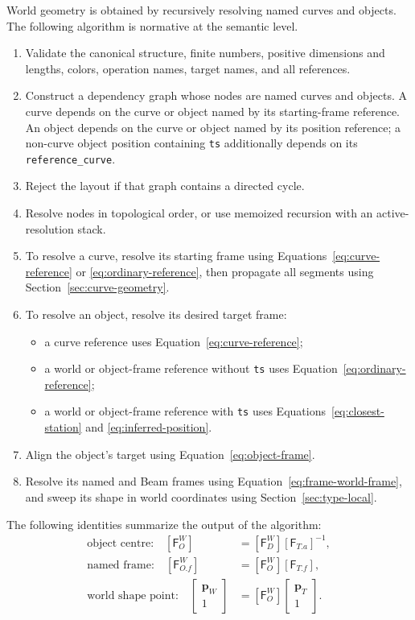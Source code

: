 \documentclass[11pt,a4paper]{article}
\newcommand{\Frame}{\mathsf{F}}
\begin{document}
World geometry is obtained by recursively resolving named curves and objects.
The following algorithm is normative at the semantic level.

\begin{enumerate}
  \item Validate the canonical structure, finite numbers, positive dimensions
        and lengths, colors, operation names, target names, and all references.
  \item Construct a dependency graph whose nodes are named curves and objects.
        A curve depends on the curve or object named by its starting-frame
        reference.  An object depends on the curve or object named by its
        position reference; a non-curve object position containing \texttt{ts}
        additionally depends on its \texttt{reference\_curve}.
  \item Reject the layout if that graph contains a directed cycle.
  \item Resolve nodes in topological order, or use memoized recursion with an
        active-resolution stack.
  \item To resolve a curve, resolve its starting frame using
        Equations~\eqref{eq:curve-reference} or
        \eqref{eq:ordinary-reference}, then propagate all segments using
        Section~\ref{sec:curve-geometry}.
  \item To resolve an object, resolve its desired target frame:
        \begin{itemize}
          \item a curve reference uses Equation~\eqref{eq:curve-reference};
          \item a world or object-frame reference without \texttt{ts} uses
                Equation~\eqref{eq:ordinary-reference};
          \item a world or object-frame reference with \texttt{ts} uses
                Equations~\eqref{eq:closest-station} and
                \eqref{eq:inferred-position}.
        \end{itemize}
  \item Align the object's target using Equation~\eqref{eq:object-frame}.
  \item Resolve its named and Beam frames using
        Equation~\eqref{eq:frame-world-frame}, and sweep its shape in world
        coordinates using Section~\ref{sec:type-local}.
\end{enumerate}

The following identities summarize the output of the algorithm:
\begin{align}
  \text{object centre:}\quad
  [\Frame_O^W]&=[\Frame_D^W][\Frame_{T.a}]^{-1},\\
  \text{named frame:}\quad
  [\Frame_{O.f}^W]&=[\Frame_O^W][\Frame_{T.f}],\\
  \text{world shape point:}\quad
  \begin{bmatrix}\mathbf{p}_W\\1\end{bmatrix}
  &=[\Frame_O^W]
    \begin{bmatrix}\mathbf{p}_T\\1\end{bmatrix}.
\end{align}
\end{document}
